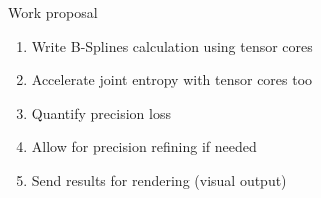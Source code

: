 \begin{frame}{Work proposal}
	\begin{enumerate}
		\item Write B-Splines calculation using tensor cores
		\item Accelerate joint entropy with tensor cores too
		\item Quantify precision loss
		\item Allow for precision refining if needed
		\item Send results for rendering (visual output)
	\end{enumerate}
\end{frame}